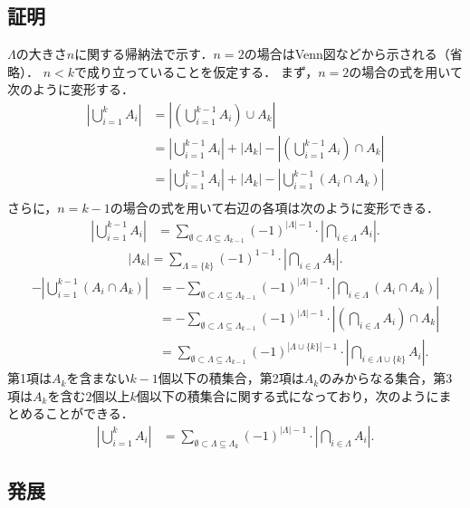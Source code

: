 \documentclass{jsarticle}
\begin{document}
\subsection{証明}
$\Lambda$の大きさ$n$に関する帰納法で示す．$n=2$の場合はVenn図などから示される（省略）．
$n<k$で成り立っていることを仮定する．
まず，$n=2$の場合の式を用いて次のように変形する．
\begin{align*}
  \left|\bigcup_{i=1}^k A_i\right| &= \left|\left(\bigcup_{i=1}^{k-1} A_i\right)\cup A_k\right|\\
  &= \left|\bigcup_{i=1}^{k-1} A_i\right| + |A_k| - \left|\left(\bigcup_{i=1}^{k-1} A_i\right)\cap A_k\right|\\
  &= \left|\bigcup_{i=1}^{k-1} A_i\right| + |A_k| - \left|\bigcup_{i=1}^{k-1} (A_i\cap A_k)\right|\\
\end{align*}
さらに，$n=k-1$の場合の式を用いて右辺の各項は次のように変形できる．
\begin{align*}
  \left|\bigcup_{i=1}^{k-1} A_i\right|
  &= \sum_{\emptyset\subset\Lambda\subseteq\Lambda_{k-1}} (-1)^{|\Lambda|-1} \cdot\left|\bigcap_{i\in\Lambda} A_i\right|.
\end{align*}
\begin{align*}
  |A_k| = \sum_{\Lambda=\{k\}} (-1)^{1-1} \cdot\left|\bigcap_{i\in\Lambda} A_i\right|.
\end{align*}
\begin{align*}
  -\left|\bigcup_{i=1}^{k-1} (A_i\cap A_k)\right|
  &= -\sum_{\emptyset\subset\Lambda\subseteq\Lambda_{k-1}} (-1)^{|\Lambda|-1} \cdot\left|\bigcap_{i\in\Lambda} (A_i\cap A_k)\right|\\
  &= -\sum_{\emptyset\subset\Lambda\subseteq\Lambda_{k-1}} (-1)^{|\Lambda|-1} \cdot\left|\left(\bigcap_{i\in\Lambda} A_i\right)\cap A_k\right|\\
  &= \sum_{\emptyset\subset\Lambda\subseteq\Lambda_{k-1}} (-1)^{|\Lambda\cup\{k\}|-1} \cdot\left|\bigcap_{i\in\Lambda\cup\{k\}} A_i\right|.
\end{align*}
第1項は$A_k$を含まない$k-1$個以下の積集合，第2項は$A_k$のみからなる集合，第3項は$A_k$を含む$2$個以上$k$個以下の積集合に関する式になっており，次のようにまとめることができる．
\begin{align*}
  \left|\bigcup_{i=1}^k A_i\right|
  &= \sum_{\emptyset\subset\Lambda\subseteq\Lambda_k} (-1)^{|\Lambda|-1} \cdot\left|\bigcap_{i\in\Lambda} A_i\right|.
\end{align*}

\subsection{発展}
\end{document}
